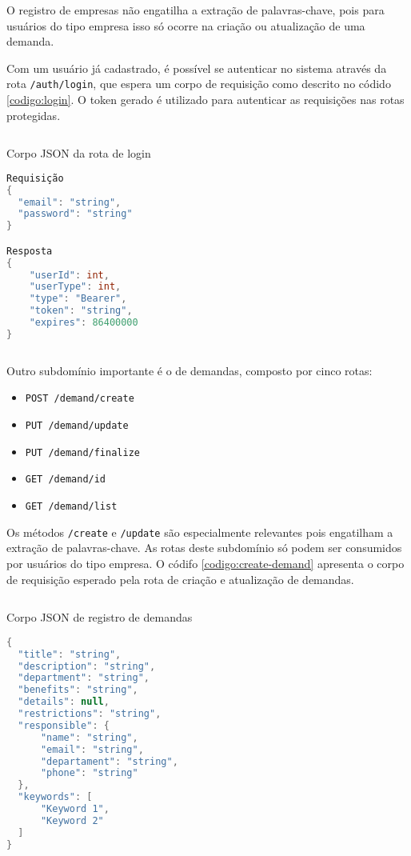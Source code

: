 O registro de empresas não engatilha a extração de palavras-chave, pois para usuários do tipo empresa isso só ocorre na criação ou atualização de uma demanda.

Com um usuário já cadastrado, é possível se autenticar no sistema através da rota \texttt{/auth/login}, que espera um corpo de requisição como descrito no códido \ref{codigo:login}. O token gerado é utilizado para autenticar as requisições nas rotas protegidas.

\begin{sourcecode}[H]
  \caption{\label{codigo:login}Corpo JSON da rota de login}
  \begin{lstlisting}[frame=single, language=Java]
Requisição
{
  "email": "string",
  "password": "string"
}

Resposta
{
	"userId": int,
	"userType": int,
	"type": "Bearer",
	"token": "string",
	"expires": 86400000
}
\end{lstlisting}
  \fonte{}
\end{sourcecode}

Outro subdomínio importante é o de demandas, composto por cinco rotas:

\begin{itemize}
  \item \texttt{POST /demand/create}
  \item \texttt{PUT /demand/update}
  \item \texttt{PUT /demand/finalize}
  \item \texttt{GET /demand/{id}}
  \item \texttt{GET /demand/list}
\end{itemize}

Os métodos \texttt{/create} e \texttt{/update} são especialmente relevantes pois engatilham a extração de palavras-chave. As rotas deste subdomínio só podem ser consumidos por usuários do tipo empresa. O códifo \ref{codigo:create-demand} apresenta o corpo de requisição esperado pela rota de criação e atualização de demandas.

\begin{sourcecode}[H]
  \caption{\label{codigo:create-demand}Corpo JSON de registro de demandas}
  \begin{lstlisting}[frame=single, language=Java]
{
  "title": "string",
  "description": "string",
  "department": "string",
  "benefits": "string",
  "details": null,
  "restrictions": "string",
  "responsible": {
      "name": "string",
      "email": "string",
      "departament": "string",
      "phone": "string"
  },
  "keywords": [
      "Keyword 1",
      "Keyword 2"
  ]
}
\end{lstlisting}
  \fonte{}
\end{sourcecode}

